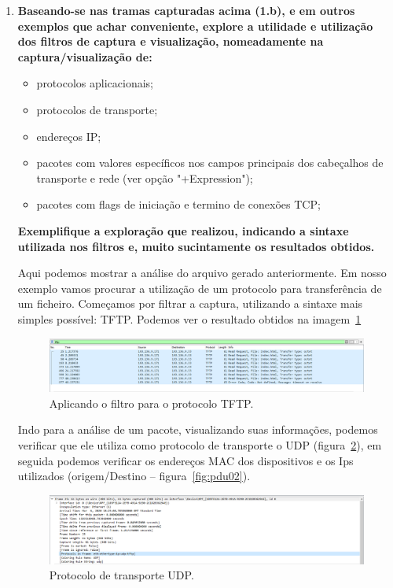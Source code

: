 \documentclass{llncs}
\begin{document}
  \begin{enumerate}[\textbf{b)}]
    \item  \textbf{Baseando-se nas tramas capturadas acima (1.b), e em outros exemplos que achar conveniente, explore a
    utilidade e utilização dos filtros de captura e visualização, nomeadamente na captura/visualização de:}
    \begin{itemize}
      \item protocolos aplicacionais;
      \item protocolos de transporte;
      \item endereços IP;
      \item pacotes com valores específicos nos campos principais dos cabeçalhos de transporte e rede (ver opção
      "+Expression");
      \item pacotes com flags de iniciação e termino de conexões TCP;
    \end{itemize}
    \par \textbf{Exemplifique a exploração que realizou, indicando a sintaxe utilizada nos filtros e, muito sucintamente os
    resultados obtidos.}
    
    \begin{flushleft}
      \par Aqui podemos mostrar a análise do arquivo gerado anteriormente. Em nosso exemplo vamos procurar a utilização de um protocolo para transferência de um ficheiro. Começamos por filtrar a captura, utilizando a sintaxe mais simples possível: TFTP. Podemos ver o resultado obtidos na imagem~\ref{fig:filtertftp}
      \begin{figure}[h]
        \includegraphics[scale=0.3]{filtertftp.png}
        \centering
        \caption{Aplicando o filtro para o protocolo TFTP.}
        \label{fig:filtertftp}
      \end{figure}  
    \end{flushleft}

    \begin{flushleft}
      \par Indo para a análise de um pacote, visualizando suas informações, podemos verificar que ele utiliza como protocolo de transporte o UDP (figura~\ref{fig:pdu01}), em seguida podemos verificar os endereços MAC dos dispositivos e os Ips utilizados (origem/Destino – figura~\ref{fig:pdu02}).
      \begin{figure}[h]
        \includegraphics[scale=0.3]{pdu01.png}
        \centering
        \caption{Protocolo de transporte UDP.}
        \label{fig:pdu01}
      \end{figure} 


\end{flushleft}
\end{enumerate}
\end{document}

